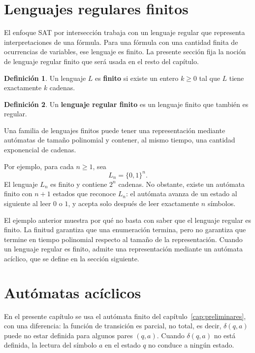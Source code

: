 \documentclass{report}
\theoremstyle{definition}
\newtheorem{definicion}{Definición}[chapter]
\theoremstyle{plain}
\theoremstyle{remark}
\begin{document}
\section{Lenguajes regulares finitos}
\label{sec:lenguajes-regulares-finitos}

El enfoque SAT por intersección trabaja con un lenguaje regular que
representa interpretaciones de una fórmula. Para una fórmula con una
cantidad finita de ocurrencias de variables, ese lenguaje es finito. La presente
sección fija la noción de lenguaje regular finito que será usada en el
resto del capítulo.

\begin{definicion}
Un lenguaje $L$ es \textbf{finito} si existe un entero $k \ge 0$ tal
que $L$ tiene exactamente $k$ cadenas.
\end{definicion}

\begin{definicion}
Un \textbf{lenguaje regular finito} es un lenguaje finito que también
es regular.
\end{definicion}

Una familia de lenguajes finitos puede tener
una representación mediante autómatas de tamaño polinomial y contener,
al mismo tiempo, una cantidad exponencial de cadenas.

Por ejemplo, para cada $n \ge 1$, sea
\[
  L_n = \{0,1\}^n.
\]
El lenguaje $L_n$ es finito y contiene $2^n$ cadenas. No obstante,
existe un autómata finito con $n+1$ estados que reconoce
$L_n$: el autómata avanza de un estado al siguiente al leer $0$ o $1$, y
acepta solo después de leer exactamente $n$ símbolos.

El ejemplo anterior muestra por qué no basta con saber que el lenguaje
regular es finito. La finitud garantiza que una enumeración termina, pero
no garantiza que termine en tiempo polinomial respecto al tamaño de la
representación. Cuando un lenguaje regular es finito, admite una
representación mediante un autómata acíclico, que se define en la
sección siguiente.

\section{Autómatas acíclicos}
\label{sec:automatas-aciclicos}

En el presente capítulo se usa el autómata finito del
capítulo~\ref{cap:preliminares}, con una diferencia: la función de
transición es parcial, no total, es decir, $\delta(q,a)$ puede no estar
definida para algunos pares $(q,a)$. Cuando $\delta(q,a)$ no está
definida, la lectura del símbolo $a$ en el estado $q$ no conduce a
ningún estado.
\end{document}
